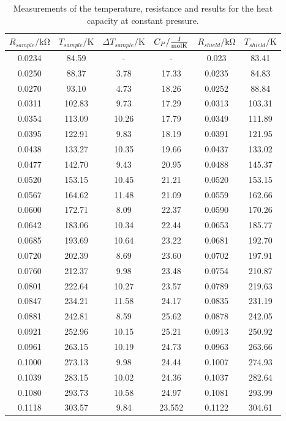 \begin{table}[htbp] 
    \centering 
    \begin{tabular}{cccc | c c} 
        \toprule  $R_{sample}/\unit{\kilo\ohm}$ & $T_{sample} / \unit{\kelvin}$ & $\Delta T_{sample} / \unit{\kelvin}$ & $C_P / \unit{\frac{\joule}{\mol\kelvin}} $ & $R_{shield}/\unit{\kilo\ohm}$ & $T_{shield} / \unit{\kelvin}$\\ 
        \midrule 
        0.0234 & 84.59   & -     & - & 0.023&  83.41  \\   
        0.0250 & 88.37   & 3.78  & 17.33    & 0.0235&  84.83  \\
        0.0270 & 93.10   & 4.73  & 18.26  & 0.0252&  88.84  \\
        0.0311 & 102.83  & 9.73  & 17.29   & 0.0313& 103.31  \\
        0.0354 & 113.09  & 10.26 & 17.79   & 0.0349& 111.89  \\
        0.0395 & 122.91  & 9.83  & 18.19  & 0.0391& 121.95  \\
        0.0438 & 133.27  & 10.35 & 19.66   & 0.0437& 133.02  \\
        0.0477 & 142.70  & 9.43  & 20.95    & 0.0488& 145.37  \\
        0.0520 & 153.15  & 10.45 & 21.21   & 0.0520& 153.15  \\
        0.0567 & 164.62  & 11.48 & 21.09   & 0.0559& 162.66  \\
        0.0600 & 172.71  & 8.09  & 22.37   & 0.0590& 170.26  \\
        0.0642 & 183.06  & 10.34 & 22.44  & 0.0653& 185.77  \\
        0.0685 & 193.69  & 10.64 & 23.22   & 0.0681& 192.70  \\
        0.0720 & 202.39  & 8.69  & 23.60   & 0.0702& 197.91  \\
        0.0760 & 212.37  & 9.98  & 23.48   & 0.0754& 210.87  \\
        0.0801 & 222.64  & 10.27 & 23.57  & 0.0789& 219.63  \\
        0.0847 & 234.21  & 11.58 & 24.17   & 0.0835& 231.19  \\
        0.0881 & 242.81  & 8.59  & 25.62  & 0.0878& 242.05  \\
        0.0921 & 252.96  & 10.15 & 25.21   & 0.0913& 250.92  \\
        0.0961 & 263.15  & 10.19 & 24.73   & 0.0963& 263.66  \\
        0.1000 & 273.13  & 9.98  & 24.44   & 0.1007& 274.93  \\
        0.1039 & 283.15  & 10.02 & 24.36   & 0.1037& 282.64  \\
        0.1080 & 293.73  & 10.58 & 24.97  & 0.1081& 293.99  \\
        0.1118 & 303.57  & 9.84  & 23.552  & 0.1122& 304.61  \\
        \bottomrule 
    \end{tabular} 
    \caption[Tabelle]{Measurements of the temperature, resistance and results for the heat capacity at constant pressure.} 
    \label{tab:measurement} 
\end{table}

